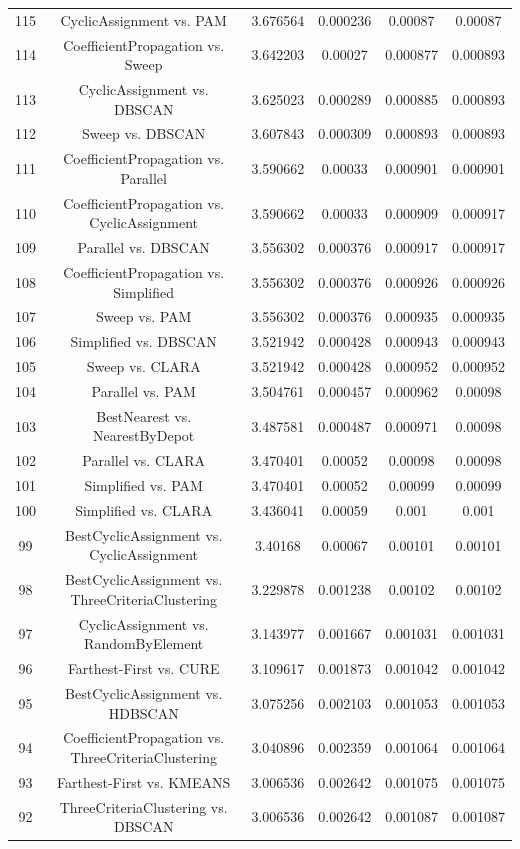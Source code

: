 \documentclass[a4paper,10pt]{article}
\begin{document}
\begin{landscape}
\begin{table}[!htp]
\begin{tabular}{cccccc}
115&CyclicAssignment vs. PAM&3.676564&0.000236&0.00087&0.00087\\
114&CoefficientPropagation vs. Sweep&3.642203&0.00027&0.000877&0.000893\\
113&CyclicAssignment vs. DBSCAN&3.625023&0.000289&0.000885&0.000893\\
112&Sweep vs. DBSCAN&3.607843&0.000309&0.000893&0.000893\\
111&CoefficientPropagation vs. Parallel&3.590662&0.00033&0.000901&0.000901\\
110&CoefficientPropagation vs. CyclicAssignment&3.590662&0.00033&0.000909&0.000917\\
109&Parallel vs. DBSCAN&3.556302&0.000376&0.000917&0.000917\\
108&CoefficientPropagation vs. Simplified&3.556302&0.000376&0.000926&0.000926\\
107&Sweep vs. PAM&3.556302&0.000376&0.000935&0.000935\\
106&Simplified vs. DBSCAN&3.521942&0.000428&0.000943&0.000943\\
105&Sweep vs. CLARA&3.521942&0.000428&0.000952&0.000952\\
104&Parallel vs. PAM&3.504761&0.000457&0.000962&0.00098\\
103&BestNearest vs. NearestByDepot&3.487581&0.000487&0.000971&0.00098\\
102&Parallel vs. CLARA&3.470401&0.00052&0.00098&0.00098\\
101&Simplified vs. PAM&3.470401&0.00052&0.00099&0.00099\\
100&Simplified vs. CLARA&3.436041&0.00059&0.001&0.001\\
99&BestCyclicAssignment vs. CyclicAssignment&3.40168&0.00067&0.00101&0.00101\\
98&BestCyclicAssignment vs. ThreeCriteriaClustering&3.229878&0.001238&0.00102&0.00102\\
97&CyclicAssignment vs. RandomByElement&3.143977&0.001667&0.001031&0.001031\\
96&Farthest-First vs. CURE&3.109617&0.001873&0.001042&0.001042\\
95&BestCyclicAssignment vs. HDBSCAN&3.075256&0.002103&0.001053&0.001053\\
94&CoefficientPropagation vs. ThreeCriteriaClustering&3.040896&0.002359&0.001064&0.001064\\
93&Farthest-First vs. KMEANS&3.006536&0.002642&0.001075&0.001075\\
92&ThreeCriteriaClustering vs. DBSCAN&3.006536&0.002642&0.001087&0.001087\\

\end{tabular}
\end{table}
\end{landscape}
\end{document}
